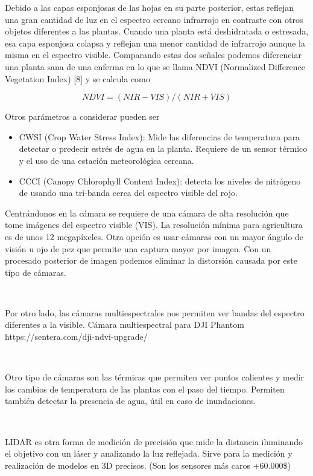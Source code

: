\documentclass[11pt,spanish]{article} %
\begin{document}
Debido a las capas esponjosas de las hojas en su parte posterior, estas reflejan una gran cantidad de luz en el espectro cercano infrarrojo en contraste con otros objetos diferentes a las plantas. Cuando una planta está deshidratada o estresada, esa capa esponjosa colapsa y reflejan una menor cantidad de infrarrojo aunque la misma en el espectro visible. Comparando estas dos señales podemos diferenciar una planta sana de una enferma en lo que se llama NDVI (Normalized Difference Vegetation Index) [8] y se calcula como

\[ NDVI=(NIR-VIS)/(NIR+VIS) \]

Otros parámetros a considerar pueden ser

\begin{itemize}
	\item CWSI (Crop Water Stress Index):
	Mide las diferencias de temperatura para detectar o predecir estrés de agua en la planta. Requiere de un sensor térmico y el uso de una estación meteorológica cercana.
	\item CCCI (Canopy Chlorophyll Content Index): detecta los niveles de nitrógeno de usando una tri-banda cerca del espectro visible del rojo.
\end{itemize}


Centrándonos en la cámara se requiere de una cámara de alta resolución que tome imágenes del espectro visible (VIS). La resolución mínima para agricultura es de unos 12 megapíxeles. Otra opción es usar cámaras con un mayor ángulo de visión u ojo de pez que permite una captura mayor por imagen. Con un procesado posterior de imagen podemos eliminar la distorsión causada por este tipo de cámaras.

\

Por otro lado, las cámaras multiespectrales nos permiten ver bandas del espectro diferentes a la visible. 
Cámara multiespectral para DJI Phantom https://sentera.com/dji-ndvi-upgrade/

\


Otro tipo de cámaras son las térmicas que permiten ver puntos calientes y medir los cambios de temperatura de las plantas con el paso del tiempo. Permiten también detectar la presencia de agua, útil en caso de inundaciones.

\

LIDAR es otra forma de medición de precisión que mide la distancia iluminando el objetivo con un láser y analizando la luz reflejada. Sirve para la medición y realización de modelos en 3D precisos. (Son los sensores más caros +60.000\$)
\end{document}
